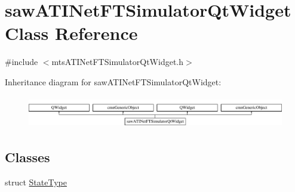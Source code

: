 \hypertarget{classsaw_a_t_i_net_f_t_simulator_qt_widget}{\section{saw\-A\-T\-I\-Net\-F\-T\-Simulator\-Qt\-Widget Class Reference}
\label{classsaw_a_t_i_net_f_t_simulator_qt_widget}
}


{\ttfamily \#include $<$mts\-A\-T\-I\-Net\-F\-T\-Simulator\-Qt\-Widget.\-h$>$}

Inheritance diagram for saw\-A\-T\-I\-Net\-F\-T\-Simulator\-Qt\-Widget\-:\begin{figure}[H]
\begin{center}
\leavevmode
\includegraphics[height=1.414141cm]{dc/d50/classsaw_a_t_i_net_f_t_simulator_qt_widget}
\end{center}
\end{figure}
\subsection*{Classes}
\begin{DoxyCompactItemize}
\item 
struct \hyperlink{structsaw_a_t_i_net_f_t_simulator_qt_widget_1_1_state_type}{State\-Type}
\end{DoxyCompactItemize}
